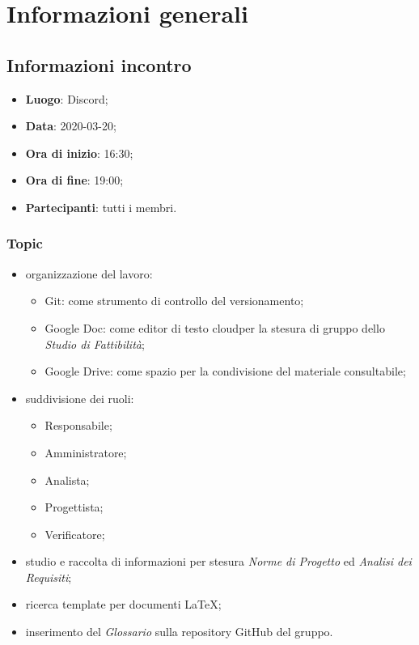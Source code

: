 \section{Informazioni generali}
\subsection{Informazioni incontro}
\begin{itemize}
\item \textbf{Luogo}: Discord\glo;
\item \textbf{Data}: 2020-03-20;
\item \textbf{Ora di inizio}: 16:30;
\item \textbf{Ora di fine}: 19:00;
\item \textbf{Partecipanti}: tutti i membri.
\end{itemize}

\subsubsection{Topic}
\begin{itemize}
\item organizzazione del lavoro:
\begin{itemize}
\item Git: come strumento di controllo del versionamento;
\item Google Doc: come editor di testo cloud\glo per la stesura di gruppo dello \textit{Studio di Fattibilità};
\item Google Drive: come spazio per la condivisione del materiale consultabile;
\end{itemize}
\item suddivisione dei ruoli: \begin{itemize}
\item Responsabile;
\item Amministratore;
\item Analista;
\item Progettista;
\item Verificatore;
\end{itemize}
\item studio e raccolta di informazioni per stesura \textit{Norme di Progetto} ed \textit{Analisi dei Requisiti};
\item ricerca template per documenti \LaTeX{};
\item inserimento del \textit{Glossario} sulla repository GitHub del gruppo.
\end{itemize}